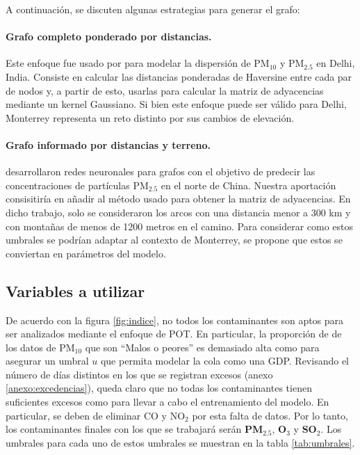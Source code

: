 \documentclass[11pt]{article}
\begin{document}
A continuación, se discuten algunas estrategias para generar el grafo:

\vspace{-20pt}
\paragraph{Grafo completo ponderado por distancias.} Este enfoque fue usado por \citet{panja2025estgcnextremespatiotemporalgraph} para modelar la dispersión de PM$_{10}$ y PM$_{2.5}$ en Delhi, India. Consiste en calcular las distancias ponderadas de Haversine entre cada par de nodos y, a partir de esto, usarlas para calcular la matriz de adyacencias mediante un kernel Gaussiano. Si bien este enfoque puede ser válido para Delhi, Monterrey representa un reto distinto por sus cambios de elevación.

\vspace{-20pt}
\paragraph{Grafo informado por distancias y terreno.} \citet{Wang_2020} desarrollaron redes neuronales para grafos con el objetivo de predecir las concentraciones de partículas PM$_{2.5}$ en el norte de China. Nuestra aportación consisitiría en añadir al método usado para obtener la matriz de adyacencias. En dicho trabajo, solo se consideraron los arcos con una distancia menor a 300 km y con montañas de menos de 1200 metros en el camino. Para considerar como estos umbrales se podrían adaptar al contexto de Monterrey, se propone que estos se conviertan en parámetros del modelo.

\subsection{Variables a utilizar}

De acuerdo con la figura \ref{fig:indice}, no todos los contaminantes son aptos para ser analizados mediante el enfoque de POT. En particular, la proporción de de los datos de PM$_{10}$ que son ``Malos o peores'' es demasiado alta como para asegurar un umbral $u$ que permita modelar la cola como una GDP. Revisando el número de días distintos en los que se registran excesos (anexo \ref{anexo:excedencias}), queda claro que no todas los contaminantes tienen suficientes excesos como para llevar a cabo el entrenamiento del modelo. En particular, se deben de eliminar CO y NO$_2$ por esta falta de datos. Por lo tanto, los contaminantes finales con los que se trabajará serán \textbf{PM$_{2.5}$}, \textbf{O$_{3}$} y \textbf{SO$_{2}$}. Los umbrales para cada uno de estos umbrales se muestran en la tabla \ref{tab:umbrales}.
\end{document}
